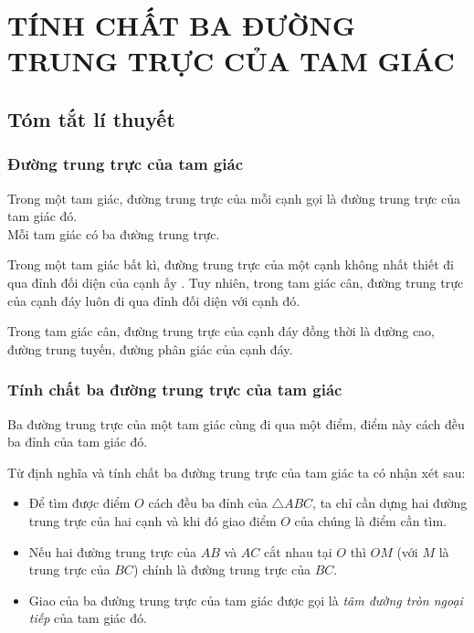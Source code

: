 
\section{TÍNH CHẤT BA ĐƯỜNG TRUNG TRỰC CỦA TAM GIÁC}
\subsection{Tóm tắt lí thuyết}
\subsubsection{Đường trung trực của tam giác}
\begin{dn}
Trong một tam giác, đường trung trực của mỗi cạnh gọi là đường trung trực của tam giác đó.\\
Mỗi tam giác có ba đường trung trực.
\end{dn}
\begin{note}
Trong một tam giác bất kì, đường trung trực của một cạnh không nhất thiết đi qua đỉnh đối diện của cạnh ấy . Tuy nhiên, trong tam giác cân, đường trung trực của cạnh đáy luôn đi qua đỉnh đối diện với cạnh đó.
\end{note}
\begin{dl}
Trong tam giác cân, đường trung trực của cạnh đáy đồng thời là đường cao, đường trung tuyến, đường phân giác của cạnh đáy.
\end{dl}
\subsubsection{Tính chất ba đường trung trực của tam giác}
\begin{tc}
Ba đường trung trực của một tam giác cùng đi qua một điểm, điểm này cách đều ba đỉnh của tam giác đó.
\end{tc}
\begin{nx} Từ định nghĩa và tính chất ba đường trung trực của tam giác ta có nhận xét sau:
	\begin{itemize}
		\item Để tìm được điểm $O$ cách đều ba đỉnh của  $\triangle ABC$, ta chỉ cần dựng hai đường trung trực của hai cạnh và khi đó  giao điểm $O$ của chúng là điểm cần tìm.
		 \item  Nếu hai đường trung trực của $AB$ và $AC$ cắt nhau tại $O$ thì $OM$ (với $M$ là trung trực của $BC$) chính là đường trung trực của $BC.$
		 \item Giao của ba đường trung trực của tam giác được gọi là {\it tâm đường tròn ngoại tiếp} của tam giác đó.
		\end{itemize}
\end{nx}

